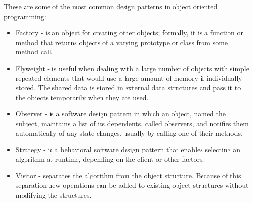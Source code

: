 These are some of the most common design patterns in object oriented programming:
\begin{itemize}
	\item Factory -  is an object for creating other objects; formally, it is a function or method that returns objects of a varying prototype or class from some method call.
	\item Flyweight - is useful when dealing with a large number of objects with simple repeated elements that would use a large amount of memory if individually stored. The shared data is stored in external data structures and pass it to the objects temporarily when they are used.
	\item Observer - is a software design pattern in which an object, named the subject, maintains a list of its dependents, called observers, and notifies them automatically of any state changes, usually by calling one of their methods.
	\item Strategy - is a behavioral software design pattern that enables selecting an algorithm at runtime, depending on the client or other factors.
	\item Visitor - separates the algorithm from the object structure. Because of this separation new operations can be added to existing object structures without modifying the structures.
\end{itemize}